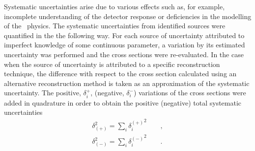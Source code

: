 Systematic uncertainties arise due to various effects such as, for example, incomplete understanding of the detector response or deficiencies in the modelling of the \ep~physics. The systematic uncertainties from identified sources were quantified in the the following way. For each source of uncertainty attributed to imperfect knowledge of some continuous parameter, a variation by its estimated uncertainty was performed and the cross sections were re-evaluated. In the case when the source of uncertainty is attributed to a specific reconstruction technique, the difference with respect to the cross section calculated using an alternative reconstruction method is taken as an approximation of the systematic uncertainty. The positive, $\delta^+_i$, (negative, $\delta^-_i$) variations of the cross sections were added in quadrature in order to obtain the positive (negative) total systematic uncertainties
\[
	\begin{aligned}
		\delta_{\left( +\right)}^{2} = \sum_i{\mbox{$\delta_i^{\left( +\right)}$}^2}\qquad,\\
		\delta_{\left( -\right)}^{2} = \sum_i{\mbox{$\delta_i^{\left( -\right)}$}^2}\qquad.
	\end{aligned}
\]

